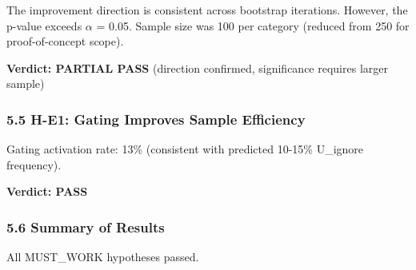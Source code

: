 The improvement direction is consistent across bootstrap iterations. However, the p-value exceeds $\alpha$ = 0.05. Sample size was 100 per category (reduced from 250 for proof-of-concept scope).

\textbf{Verdict: PARTIAL PASS} (direction confirmed, significance requires larger sample)

\subsubsection{5.5 H-E1: Gating Improves Sample Efficiency}

\begin{table}[htbp]
\centering
{}
\end{table}

Gating activation rate: 13\% (consistent with predicted 10-15\% U\_ignore frequency).

\textbf{Verdict: PASS}

\subsubsection{5.6 Summary of Results}

\begin{table}[htbp]
\centering
{}
\end{table}

All MUST\_WORK hypotheses passed.

